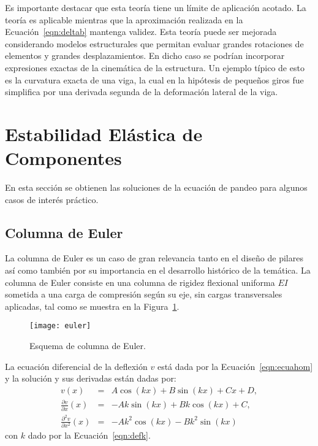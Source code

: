 Es importante destacar que esta teoría tiene un límite de aplicación acotado. La teoría es aplicable mientras que la aproximación realizada en la Ecuación~\ref{eqn:deltab} mantenga validez. %
%
Esta teoría puede ser mejorada considerando modelos estructurales que permitan evaluar grandes rotaciones de elementos y grandes desplazamientos. En dicho caso se podrían incorporar expresiones exactas de la cinemática de la estructura. %
%
Un ejemplo típico de esto es la curvatura exacta de una viga, la cual en la hipótesis de pequeños giros fue simplifica por una derivada segunda de la deformación lateral de la viga.


\section{Estabilidad Elástica de Componentes} \label{sec:componentes}

En esta sección se obtienen las soluciones de la ecuación de pandeo para algunos casos de interés práctico.

\subsection{Columna de Euler}

La columna de Euler es un caso de gran relevancia tanto en el diseño de pilares así como también por su importancia en el desarrollo histórico de la temática.
%
La columna de Euler consiste en una columna de rigidez flexional uniforma $EI$ sometida a una carga de compresión según su eje, sin cargas transversales aplicadas, tal como se muestra en la Figura~\ref{fig:euler}.

\begin{figure}[htb]
	\centering
	\texttt{[image: euler]}
	\caption{Esquema de columna de Euler.}
	\label{fig:euler}
\end{figure}

La ecuación diferencial de la deflexión $v$ está dada por la Ecuación~\eqref{eqn:ecuahom} y la solución y sus derivadas están dadas por:
%
\begin{eqnarray}
v(x) &=& A \cos(k x ) + B \sin(kx) + C x + D, \\
\frac{\partial   v}{\partial x  } (x) &=& -A k \sin(k x ) + B k \cos(kx) + C , \\
\frac{\partial^2 v}{\partial x^2} (x) &=& - A k^2 \cos(k x ) - B k^2 \sin(kx)
\end{eqnarray}
con $k$ dado por la Ecuación~\eqref{eqn:defk}.

